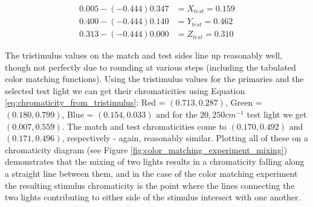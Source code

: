 \documentclass{article}
\begin{document}
\begin{multicols}{2}
\begin{equation} %
    \begin{aligned}
        0.005-(-0.444)0.347&=X_{test}=0.159\\
        0.400-(-0.444)0.140&=Y_{test}=0.462\\
        0.313-(-0.444)0.000&=Z_{test}=0.310
    \end{aligned}
\end{equation}

The tristimulus values on the match and test sides line up reasonably well, though not perfectly due to rounding at various steps (including the tabulated color matching functions).  Using the tristimulus values for the primaries and the selected test light we can get their chromaticities using Equation \ref{eq:chromaticity_from_tristimulus}: Red = $(0.713,0.287)$, Green = $(0.180,0.799)$, Blue = $(0.154,0.033)$ and for the $20,250cm^{-1}$ test light we get $(0.007,0.559)$.  The match and test chromaticities come to $(0.170,0.492)$ and $(0.171,0.496)$, respectively - again, reasonably similar.  Plotting all of these on a chromaticity diagram (see Figure \ref{fig:color_matching_experiment_mixing}) demonstrates that the mixing of two lights results in a chromaticity falling along a straight line between them, and in the case of the color matching experiment the resulting stimulus chromaticity is the point where the lines connecting the two lights contributing to either side of the stimulus intersect with one another.


\end{multicols}
\end{document}
